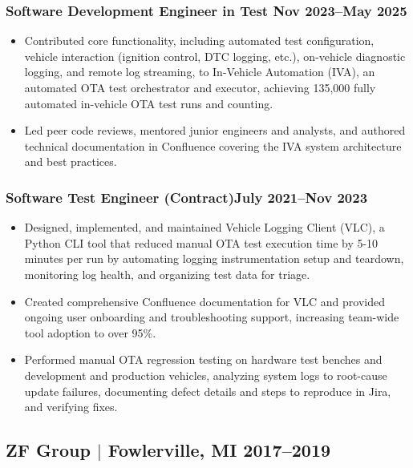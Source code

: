 \documentclass[10pt]{article}
\begin{document}
\subsubsection{Software Development Engineer in Test \hfill Nov 2023--May 2025}
\begin{itemize}
  \item Contributed core functionality, including automated test configuration,
  vehicle interaction (ignition control, DTC logging, etc.), on-vehicle 
  diagnostic logging, and remote log streaming, to In-Vehicle Automation (IVA), 
  an automated OTA test orchestrator and executor, achieving 135,000 fully 
  automated in-vehicle OTA test runs and counting.
  \item Led peer code reviews, mentored junior engineers and analysts, and 
  authored technical documentation in Confluence covering the IVA system 
  architecture and best practices.
\end{itemize}

\subsubsection{Software Test Engineer (Contract)\hfill July 2021--Nov 2023}
\begin{itemize}
  \item Designed, implemented, and maintained Vehicle Logging Client (VLC),
  a Python CLI tool that reduced manual OTA test execution time by 5-10 minutes 
  per run by automating logging instrumentation setup and teardown, monitoring 
  log health, and organizing test data for triage.
  \item Created comprehensive Confluence documentation for VLC and provided 
  ongoing user onboarding and troubleshooting support, increasing team-wide 
  tool adoption to over 95\%.
  \item Performed manual OTA regression testing on hardware test benches and 
  development and production vehicles, analyzing system logs to root-cause 
  update failures, documenting defect details and steps to reproduce in Jira, 
  and verifying fixes.
\end{itemize}

\subsection{ZF Group $|$ {\normalfont Fowlerville, MI} \hfill 2017--2019}
\end{document}
